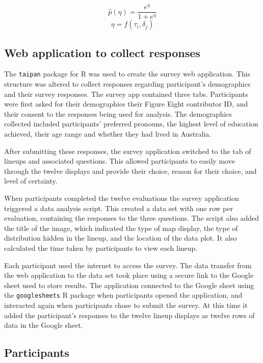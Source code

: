 \documentclass[times, doublespace]{anzsauth}
\begin{document}
\[\widehat{p}(\eta) = \frac{e^{\eta}}{1 + e^{\eta}}\]
\label{eq:transform} \[\eta = f(\tau_i,\delta_j)\]

\subsection{Web application to collect
responses}\label{web-application-to-collect-responses}

The  \texttt{taipan} \citep{taipan} package for R was used to
create the survey web application. This structure was altered to collect
responses regarding participant's demographics and their survey
responses. The survey app contained three tabs. Participants were first
asked for their demographics their Figure Eight contributor ID, and
their consent to the responses being used for analysis. The demographics
collected included participants' preferred pronouns, the highest level of
education achieved, their age range and whether they had lived in
Australia.

After submitting these responses, the survey application switched to the
tab of lineups and associated questions. This allowed participants to
easily move through the twelve displays and provide their choice, reason
for their choice, and level of certainty.

When participants completed the twelve evaluations the survey
application triggered a data analysis script. This created a data set
with one row per evaluation, containing the responses to the three
questions. The script also added the title of the image, which indicated
the type of map display, the type of distribution hidden in the lineup,
and the location of the data plot. It also calculated the time taken by
participants to view each lineup.

Each participant used the internet to access the survey. The data
transfer from the web application to the data set took place using a
secure link to the Google sheet used to store results. The application
connected to the Google sheet using the  \texttt{googlesheets}
\citep{sheets} R package when participants opened the
application, and interacted again when participants chose to submit the
survey. At this time it added the participant's responses to the twelve
lineup displays as twelve rows of data in the Google sheet.

\subsection{Participants}\label{participants}
\end{document}

